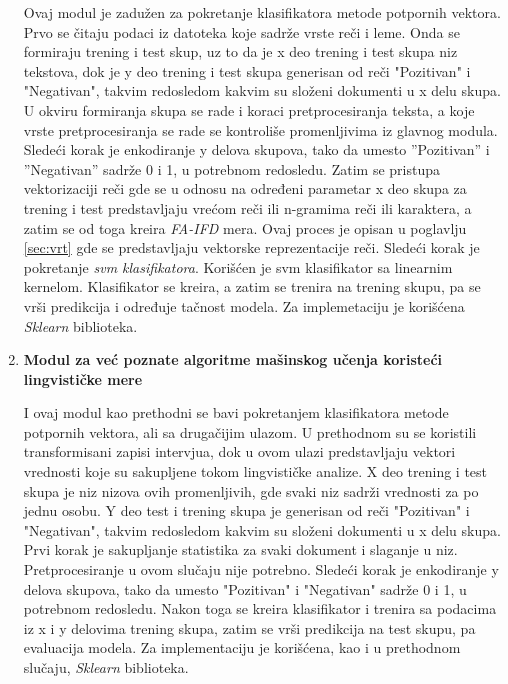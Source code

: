\documentclass[12pt,oneside]{memoir}
\begin{document}
\begin{enumerate}
Ovaj modul je zadužen za pokretanje klasifikatora metode potpornih vektora. Prvo se čitaju podaci iz datoteka koje sadrže vrste reči i leme. Onda se formiraju trening i test skup, uz to da je x deo trening i test skupa niz tekstova, dok je y deo trening i test skupa generisan od reči "Pozitivan" i "Negativan", takvim redosledom kakvim su složeni dokumenti u x delu skupa. U okviru formiranja skupa se rade i koraci pretprocesiranja teksta, a koje vrste pretprocesiranja se rade se kontroliše promenljivima iz glavnog modula. Sledeći korak je enkodiranje y delova skupova, tako da umesto ”Pozitivan” i ”Negativan” sadrže 0 i 1, u potrebnom redosledu. Zatim se pristupa vektorizaciji reči gde se u odnosu na određeni parametar x deo skupa za trening i test predstavljaju vrećom reči ili n-gramima reči ili karaktera, a zatim se od toga kreira \textit{FA-IFD} mera.  Ovaj proces je opisan u poglavlju \ref{sec:vrt} gde se predstavljaju vektorske reprezentacije reči. Sledeći korak je pokretanje \textit{svm klasifikatora}.    
\newpage
\noindent
Korišćen je svm klasifikator sa linearnim kernelom. Klasifikator se kreira, a zatim se trenira na trening skupu, pa se vrši predikcija i određuje tačnost modela. Za implemetaciju je korišćena \textit{Sklearn} biblioteka.


\item \textbf{Modul za već poznate algoritme mašinskog učenja koristeći lingvističke mere}

I ovaj modul kao prethodni se bavi pokretanjem klasifikatora metode potpornih vektora,  ali sa drugačijim ulazom.  U prethodnom su se   koristili transformisani zapisi intervjua,  dok u ovom ulazi predstavljaju vektori vrednosti koje su sakupljene tokom lingvističke analize.  X deo trening i test skupa je niz nizova ovih promenljivih,  gde svaki niz sadrži vrednosti za po jednu osobu.  Y deo test i trening skupa je generisan od reči "Pozitivan" i "Negativan", takvim redosledom kakvim su složeni dokumenti u x delu skupa.  Prvi korak je sakupljanje statistika za svaki dokument i slaganje u niz. Pretprocesiranje u ovom slučaju nije potrebno. Sledeći korak je enkodiranje y delova skupova, tako da umesto "Pozitivan" i "Negativan" sadrže 0 i 1, u potrebnom redosledu.  Nakon toga se kreira klasifikator i trenira sa podacima iz x i y delovima trening skupa, zatim se vrši predikcija na test skupu, pa evaluacija modela. Za implementaciju je korišćena, kao i u prethodnom slučaju, \textit{Sklearn} biblioteka. 

\end{enumerate}
\end{document}
